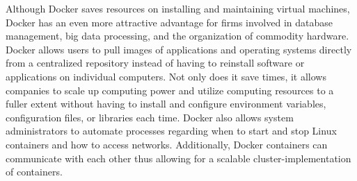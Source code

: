 	Although Docker saves resources on installing and maintaining virtual machines, Docker has an even more attractive advantage for firms involved in database management, big data processing, and the organization of commodity hardware. Docker allows users to pull images of applications and operating systems directly from a centralized repository instead of having to reinstall software or applications on individual computers. Not only does it save times, it allows companies to scale up computing power and utilize computing resources to a fuller extent without having to install and configure environment variables, configuration files, or libraries each time. Docker also allows system administrators to automate processes regarding when to start and stop Linux containers and how to access networks. Additionally, Docker containers can communicate with each other thus allowing for a scalable cluster-implementation of containers.


